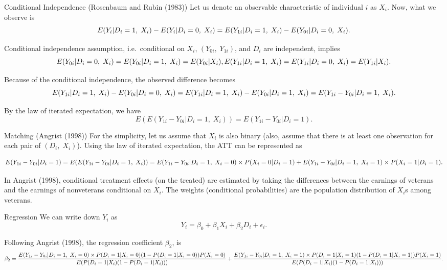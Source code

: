 \documentclass[
  ignorenonframetext,
]{beamer}
\begin{document}
\begin{frame}{Conditional Independence (Rosenbaum and Rubin (1983))}
\protect\hypertarget{conditional-independence-rosenbaum1983central}{}
Let us denote an observable characteristic of individual \(i\) as
\(X_i\). Now, what we observe is \[
E(Y_i|D_i=1,\;X_i)-E(Y_i|D_i=0,\;X_i)= \\
E(Y_{1i}|D_i=1,\;X_i)-E(Y_{0i}|D_i=0,\;X_i).
\]

Conditional independence assumption, i.e.~conditional on \(X_i\),
\((Y_{0i},\;Y_{1i})\), and \(D_i\) are independent, implies \[
E(Y_{0i}|D_i=0,\;X_i)=E(Y_{0i}|D_i=1,\;X_i)=E(Y_{0i}|X_i), \\
E(Y_{1i}|D_i=1,\;X_i)=E(Y_{1i}|D_i=0,\;X_i)=E(Y_{1i}|X_i). \\
\]

Because of the conditional independence, the observed difference becomes
\[
E(Y_{1i}|D_i=1,\;X_i)-E(Y_{0i}|D_i=0,\;X_i)= \\
E(Y_{1i}|D_i=1,\;X_i)-E(Y_{0i}|D_i=1,\;X_i)= \\
E(Y_{1i}-Y_{0i}|D_i=1,\;X_i).
\]

By the law of iterated expectation, we have \[
E(E(Y_{1i}-Y_{0i}|D_i=1,\;X_i))=E(Y_{1i}-Y_{0i}|D_i=1).
\]
\end{frame}

\begin{frame}{Matching (Angrist (1998))}
\protect\hypertarget{matching-angrist1998}{}
For the simplicity, let us assume that \(X_i\) is also binary (also,
assume that there is at least one observation for each pair of
\((D_i,\;X_i)\)). Using the law of iterated expectation, the ATT can be
represented as

\[
E(Y_{1i}-Y_{0i}|D_i=1)=\\
E(E(Y_{1i}-Y_{0i}|D_i=1,\;X_i))=\\
E(Y_{1i}-Y_{0i}|D_i=1,\;X_i=0) \times P(X_i=0|D_i=1)+ \\
E(Y_{1i}-Y_{0i}|D_i=1,\;X_i=1) \times P(X_i=1|D_i=1).
\]

In Angrist (1998), conditional treatment effects (on the treated) are
estimated by taking the differences between the earnings of veterans and
the earnings of nonveterans conditional on \(X_i\). The weights
(conditional probabilities) are the population distribution of \(X_i\)s
among veterans.
\end{frame}

\begin{frame}{Regression}
\protect\hypertarget{regression}{}
We can write down \(Y_i\) as \[
Y_i=\beta_0+\beta_1 X_i+ \beta_2 D_i+\epsilon_i.
\]

Following Angrist (1998), the regression coefficient \(\beta_2\), is \[
\beta_2=\frac{E(Y_{1i}-Y_{0i}|D_i=1,\;X_i=0) \times P(D_i=1|X_i=0)(1-P(D_i=1|X_i=0))P(X_i=0)}{E(P(D_i=1|X_i)(1-P(D_i=1|X_i)))}+\\
\frac{E(Y_{1i}-Y_{0i}|D_i=1,\;X_i=1) \times P(D_i=1|X_i=1)(1-P(D_i=1|X_i=1))P(X_i=1)}{E(P(D_i=1|X_i)(1-P(D_i=1|X_i)))}.
\]
\end{frame}
\end{document}
